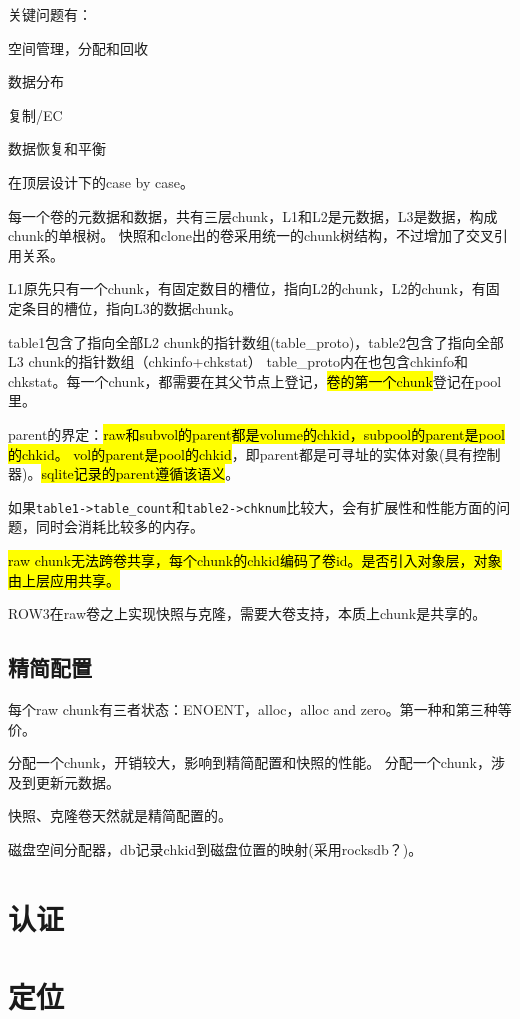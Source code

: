 关键问题有：
\begin{enumbox}
\item 空间管理，分配和回收
\item 数据分布
\item 复制/EC
\item 数据恢复和平衡
\end{enumbox}

在顶层设计下的case by case。

每一个卷的元数据和数据，共有三层chunk，L1和L2是元数据，L3是数据，构成chunk的单根树。
快照和clone出的卷采用统一的chunk树结构，不过增加了交叉引用关系。

L1原先只有一个chunk，有固定数目的槽位，指向L2的chunk，L2的chunk，有固定条目的槽位，指向L3的数据chunk。

table1包含了指向全部L2 chunk的指针数组(table\_proto)，table2包含了指向全部L3 chunk的指针数组（chkinfo+chkstat）
table\_proto内在也包含chkinfo和chkstat。每一个chunk，都需要在其父节点上登记，\hl{卷的第一个chunk}登记在pool里。

parent的界定：\hl{raw和subvol的parent都是volume的chkid，subpool的parent是pool的chkid。
vol的parent是pool的chkid}，即parent都是可寻址的实体对象(具有控制器)。\hl{sqlite记录的parent遵循该语义}。

如果\verb|table1->table_count|和\verb|table2->chknum|比较大，会有扩展性和性能方面的问题，同时会消耗比较多的内存。

\hl{raw chunk无法跨卷共享，每个chunk的chkid编码了卷id。是否引入对象层，对象由上层应用共享。}

ROW3在raw卷之上实现快照与克隆，需要大卷支持，本质上chunk是共享的。

\subsection{精简配置}

每个raw chunk有三者状态：ENOENT，alloc，alloc and zero。第一种和第三种等价。

分配一个chunk，开销较大，影响到精简配置和快照的性能。
分配一个chunk，涉及到更新元数据。

快照、克隆卷天然就是精简配置的。

磁盘空间分配器，db记录chkid到磁盘位置的映射(采用rocksdb？)。

\section{认证}

\section{定位}

